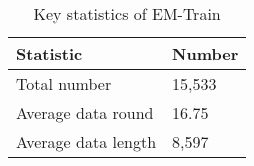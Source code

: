 
\begin{table}[t!]
\centering
\scriptsize
\caption{Key statistics of EM-Train}
\label{table:em_train}
\vskip 0.15in
\vspace{-2mm}
\setlength{\tabcolsep}{1.1mm}
\begin{tabular}{ll}
\toprule
\textbf{Statistic} & \textbf{Number} \\
\midrule
Total number  &   15,533   \\
Average data round &  16.75  \\
Average data length &  8,597  \\
\bottomrule
\end{tabular}
\vspace{-2mm}
\end{table}
